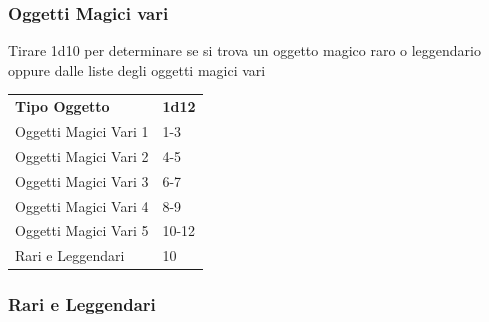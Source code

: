 \begin{multicols}{2}
\subsubsection{Oggetti Magici vari}

Tirare 1d10 per determinare se si trova un oggetto magico raro o leggendario oppure dalle liste degli oggetti magici vari

\medskip

\begin{tabular}{ll}
\textbf{Tipo Oggetto} & \textbf{1d12}\\
Oggetti Magici Vari 1&1-3\\
Oggetti Magici Vari 2&4-5\\
Oggetti Magici Vari 3&6-7\\
Oggetti Magici Vari 4&8-9\\
Oggetti Magici Vari 5&10-12\\
Rari e Leggendari&10\\
\end{tabular}

\medskip


\subsubsection{Rari e Leggendari}

\medskip


\end{multicols}

